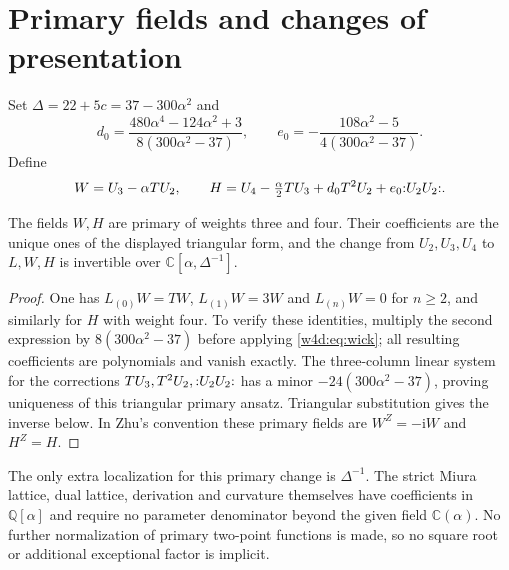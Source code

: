 \section{Primary fields and changes of presentation}\label{w4d:sec:primary}
Set $\Delta=22+5c=37-300\alpha^2$ and
\[
 d_0=\frac{480\alpha^4-124\alpha^2+3}{8(300\alpha^2-37)},
 \qquad e_0=-\frac{108\alpha^2-5}{4(300\alpha^2-37)}.
\]
Define
\begin{equation}\label{w4d:eq:primary}
 W=U_3-\alpha TU_2,\qquad
 H=U_4-\tfrac\alpha2TU_3+d_0T^2U_2+e_0\mathopen{:}U_2U_2\mathclose{:}.
\end{equation}
\begin{proposition}\label{w4d:prop:primary}
The fields $W,H$ are primary of weights three and four. Their
coefficients are the unique ones of the displayed triangular form,
and the change from $U_2,U_3,U_4$ to $L,W,H$ is invertible over
$\mathbb C[\alpha,\Delta^{-1}]$.
\end{proposition}
\begin{proof}
One has $L_{(0)}W=TW$, $L_{(1)}W=3W$ and $L_{(n)}W=0$ for $n\geq2$, and similarly for $H$ with weight four. To verify these identities, multiply the second expression by $8(300\alpha^2-37)$ before applying \eqref{w4d:eq:wick}; all resulting coefficients are polynomials and vanish exactly. The three-column linear system for the corrections $TU_3,T^2U_2,\mathopen{:}U_2U_2\mathclose{:}$ has a minor $-24(300\alpha^2-37)$, proving uniqueness of this triangular primary ansatz. Triangular substitution gives the inverse below. In Zhu's convention these primary fields are $W^Z=-\mathrm i W$ and $H^Z=H$.
\end{proof}

The only extra localization for this primary change is $\Delta^{-1}$. The strict Miura lattice, dual lattice, derivation and curvature themselves have coefficients in $\mathbb Q[\alpha]$ and require no parameter denominator beyond the given field $\mathbb C(\alpha)$. No further normalization of primary two-point functions is made, so no square root or additional exceptional factor is implicit.

